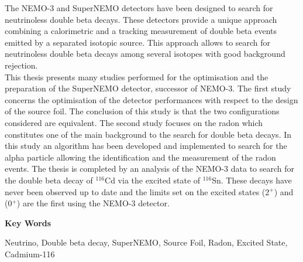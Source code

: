 \documentclass[main.tex]{subfiles}
\begin{document}
\noindent The NEMO-3 and SuperNEMO detectors have been designed to search for neutrinoless double beta decays. These detectors provide a unique approach combining a calorimetric and a tracking measurement of double beta events emitted by a separated isotopic source. This approach allows to search for neutrinoless double beta decays among several isotopes with good background rejection. \\
\noindent This thesis presents many studies performed for the optimisation and the preparation of the SuperNEMO detector, successor of NEMO-3. The first study concerns the optimisation of the detector performances with respect to the design of the source foil. The conclusion of this study is that the two configurations considered are equivalent. The second study focuses on the radon which constitutes one of the main background to the search for double beta decays. In this study an algorithm has been developed and implemented to search for the alpha particle allowing the identification and the measurement of the radon events. The thesis is completed by an analysis of the NEMO-3 data to search for the double beta decay of $^{\text{116}}$Cd via the excited state of $^{\text{116}}$Sn. These decays have never been observed up to date and the limits set on the excited states (2$^+$) and (0$^+$) are the first using the NEMO-3 detector.

\NI \textbf{Key Words}

\smallskip

\NI \small{Neutrino, Double beta decay, SuperNEMO, Source Foil, Radon, Excited State, Cadmium-116}



\end{document}
